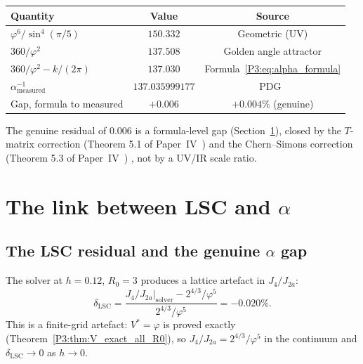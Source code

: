\documentclass[11pt,a4paper]{article}
\theoremstyle{definition}
\theoremstyle{remark}
\newcommand{\vp}{\varphi}
\newcommand{\aInv}{\alpha^{-1}}
\newcommand{\LSC}{\mathrm{LSC}}
\begin{document}
\begin{center}
\renewcommand{\arraystretch}{1.3}
\begin{tabular}{lcc}
\toprule
Quantity & Value & Source \\
\midrule
$\vp^6/\sin^4(\pi/5)$ & $150.332$ & Geometric (UV) \\
$360/\vp^2$ & $137.508$ & Golden angle attractor \\
$360/\vp^2 - k/(2\pi)$ & $137.030$ & Formula~\eqref{P3:eq:alpha_formula} \\
$\aInv_{\mathrm{measured}}$ & $137.035999177$ & PDG~\cite{PDG2024} \\
\midrule
Gap, formula to measured & $+0.006$ & $+0.004\%$ (genuine) \\
\bottomrule
\end{tabular}
\end{center}

\bigskip
The genuine residual of $0.006$ is a formula-level gap
(Section~\ref{P3:sec:lsc_alpha_link}), closed by the $T$-matrix
correction (Theorem 5.1 of Paper~IV~\cite{Paper4})%
and the Chern--Simons correction (Theorem 5.3 of Paper~IV~\cite{Paper4})%
, not by a UV/IR scale ratio.

\section{The link between LSC and $\alpha$}
\label{P3:sec:lsc_alpha_link}

\subsection{The LSC residual and the genuine $\alpha$ gap}

The solver at $h=0.12$, $R_0=3$ produces a lattice artefact in $J_4/J_{2a}$:
\begin{equation}
  \delta_{\LSC} = \frac{J_4/J_{2a}\big|_{\mathrm{solver}} - 2^{4/3}/\vp^5}
                       {2^{4/3}/\vp^5}
                = -0.020\%.
  \label{P3:eq:lsc_gap}
\end{equation}
This is a finite-grid artefact: $V^*=\vp$ is proved exactly
(Theorem~\ref{P3:thm:V_exact_all_R0}), so $J_4/J_{2a} = 2^{4/3}/\vp^5$ in
the continuum and $\delta_{\LSC}\to 0$ as $h\to 0$.
\end{document}
